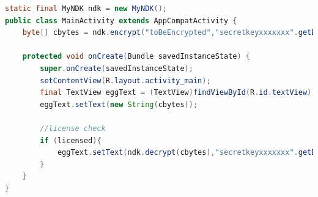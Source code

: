 \begin{lstlisting}[language=Java, caption=NDK Encryption/Decryption, label=ndk_enc_dec]
static final MyNDK ndk = new MyNDK();
public class MainActivity extends AppCompatActivity {
    byte[] cbytes = ndk.encrypt("toBeEncrypted","secretkeyxxxxxxx".getBytes());

    protected void onCreate(Bundle savedInstanceState) {
        super.onCreate(savedInstanceState);
        setContentView(R.layout.activity_main);
        final TextView eggText = (TextView)findViewById(R.id.textView);
        eggText.setText(new String(cbytes));

        //license check
        if (licensed){
            eggText.setText(ndk.decrypt(cbytes),"secretkeyxxxxxxx".getBytes());
        }
    }
}
\end{lstlisting}






